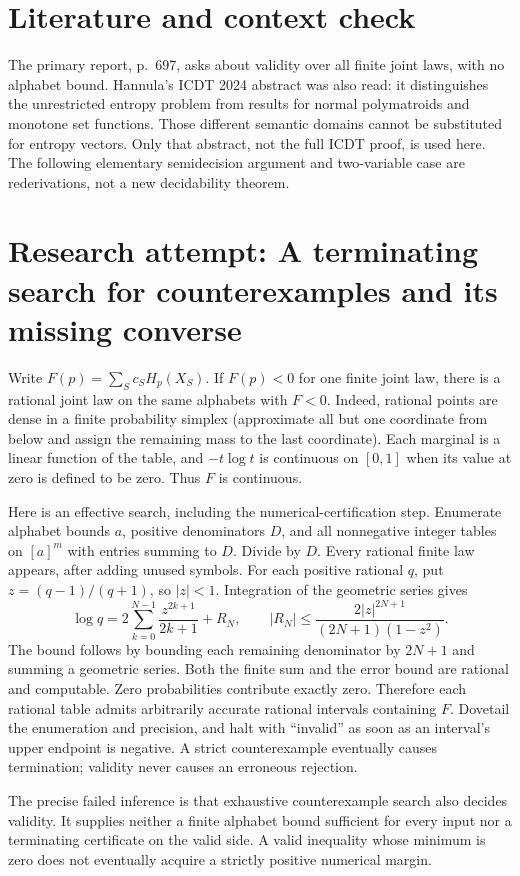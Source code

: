 \documentclass[11pt]{article}
\begin{document}
\section{Literature and context check}
The primary report, p.~697, asks about validity over all finite joint laws, with no alphabet bound. Hannula's ICDT 2024 abstract was also read: it distinguishes the unrestricted entropy problem from results for normal polymatroids and monotone set functions. Those different semantic domains cannot be substituted for entropy vectors. Only that abstract, not the full ICDT proof, is used here. The following elementary semidecision argument and two-variable case are rederivations, not a new decidability theorem.
\section{Research attempt: A terminating search for counterexamples and its missing converse}
Write $F(p)=\sum_S c_SH_p(X_S)$. If $F(p)<0$ for one finite joint law, there is a rational joint law on the same alphabets with $F<0$. Indeed, rational points are dense in a finite probability simplex (approximate all but one coordinate from below and assign the remaining mass to the last coordinate). Each marginal is a linear function of the table, and $-t\log t$ is continuous on $[0,1]$ when its value at zero is defined to be zero. Thus $F$ is continuous.

Here is an effective search, including the numerical-certification step. Enumerate alphabet bounds $a$, positive denominators $D$, and all nonnegative integer tables on $[a]^m$ with entries summing to $D$. Divide by $D$. Every rational finite law appears, after adding unused symbols. For each positive rational $q$, put $z=(q-1)/(q+1)$, so $|z|<1$. Integration of the geometric series gives
\[
 \log q=2\sum_{k=0}^{N-1}\frac{z^{2k+1}}{2k+1}+R_N,
 \qquad |R_N|\leq\frac{2|z|^{2N+1}}{(2N+1)(1-z^2)}.
\]
The bound follows by bounding each remaining denominator by $2N+1$ and summing a geometric series. Both the finite sum and the error bound are rational and computable. Zero probabilities contribute exactly zero. Therefore each rational table admits arbitrarily accurate rational intervals containing $F$. Dovetail the enumeration and precision, and halt with ``invalid'' as soon as an interval's upper endpoint is negative. A strict counterexample eventually causes termination; validity never causes an erroneous rejection.

The precise failed inference is that exhaustive counterexample search also decides validity. It supplies neither a finite alphabet bound sufficient for every input nor a terminating certificate on the valid side. A valid inequality whose minimum is zero does not eventually acquire a strictly positive numerical margin.
\end{document}
